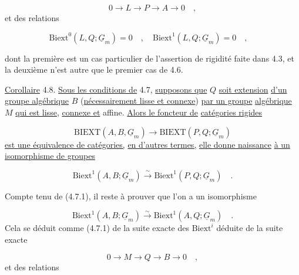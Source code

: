\begin{equation*}
0 \longrightarrow L \longrightarrow P \longrightarrow A \longrightarrow 0 \quad ,
\end{equation*}
et des relations

\begin{equation*}
\mathrm{Biext}^0(L,Q;\underline{G}_m) = 0 \quad , \quad \mathrm{Biext}^1(L,Q;\underline{G}_m) = 0 \quad , \quad 
\end{equation*}


 dont la première est un cas particulier de l'assertion de rigidité faite dans 4.3, et la deuxième n'est autre que le premier cas de 4.6.

\underline{Corollaire} 4.8. \underline{Sous les conditions de} 4.7, \underline{supposons que} $Q$ \underline{soit extension} \underline{d'un groupe algébrique} $B$ (\underline{nécessairement lisse et connexe}) \underline{par un groupe} \underline{algébrique} $M$ \underline{qui est lisse}, \underline{connexe et} affine. \underline{Alors le foncteur de} \underline{catégories rigides}

\begin{equation*}
\mathrm{BIEXT}(A,B,\underline{G}_m) \longrightarrow \mathrm{BIEXT}(P,Q;\underline{G}_m)
\end{equation*}
\underline{est une équivalence de catégories,} \underline{en d'autres termes,} \underline{elle donne naissance} \underline{à un isomorphisme de groupes}

\begin{equation}\tag{4.8.1}
\mathrm{Biext}^1(A,B;\underline{G}_m) \stackrel{\sim}{\longrightarrow} \mathrm{Biext}^1(P,Q;\underline{G}_m) \quad .
\end{equation}

Compte tenu de (4.7.1), il reste à prouver que l'on a un isomorphisme

\begin{equation*}
\mathrm{Biext}^1(A,B;\underline{G}_m) \stackrel{\sim}{\longrightarrow} \mathrm{Biext}^1(A,Q;\underline{G}_m) \quad .
\end{equation*}
Cela se déduit comme (4.7.1) de la suite exacte des $\mathrm{Biext}^i$ déduite de la suite exacte

\begin{equation*}
0 \longrightarrow M \longrightarrow Q \longrightarrow B \longrightarrow 0 \quad ,
\end{equation*}
et des relations

